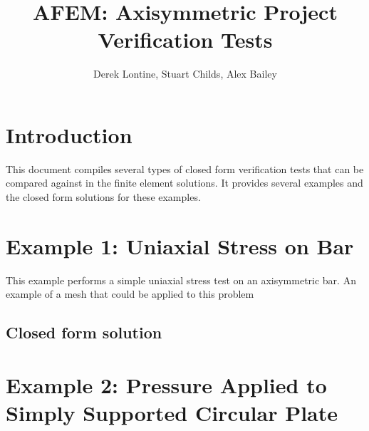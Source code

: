 \documentclass[10pt,letterpaper]{report}
\author{Derek Lontine, Stuart Childs, Alex Bailey}
\title{AFEM: Axisymmetric Project Verification Tests}
\numberwithin{equation}{chapter}
\begin{document}
\maketitle

\chapter{Introduction}
This document compiles several types of closed form verification tests that can be compared against in the finite element solutions. It provides several examples and the closed form solutions for these examples. 

\chapter{Example 1: Uniaxial Stress on Bar}
This example performs a simple uniaxial stress test on an axisymmetric bar. An example of a mesh that could be applied to this problem 

\section{Closed form solution}

\chapter{Example 2: Pressure Applied to Simply Supported Circular Plate}
\end{document}
